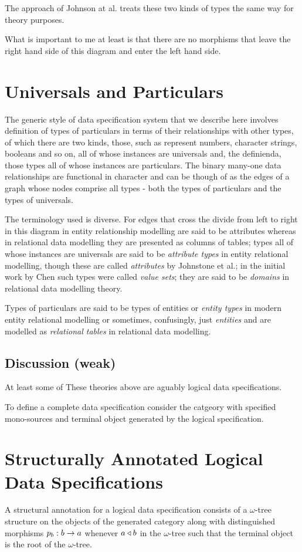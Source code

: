 \documentclass[10pt,a4paper]{article}
\theoremstyle{remark}
\begin{document}
The approach of Johnson at al. treats these two kinds of types the same way for theory purposes. 

What is important to me at least is that there are no morphisms that leave the right hand side of this diagram and enter the left hand side.


\section{Universals and Particulars}
The generic style of data specification system
that we describe here involves definition of types of particulars in terms of their relationships with other types,
of which there are two kinds, those, such as represent numbers, character strings, booleans and so on, all of
whose instances are universals and, the definienda, those types all of whose instances are particulars. The binary many-one data relationships  are functional in character and can be though of as the edges of a graph whose nodes comprise all types - both the types of particulars and the types of universals. 


The terminology used is diverse. For edges that cross the divide from left to right in this diagram 
in entity relationship modelling 
are said to be attributes whereas in relational data modelling they are presented as columns of tables; types all of whose instances are universals  are said to be \textit{attribute types} in entity relational 
modelling, though  these are called \textit{attributes} by Johnstone et al.; in the initial work by  Chen such types were called \textit{value sets}; they are said to be \textit{domains} in relational data modelling theory. 

\newcommand{\Veee}{V}
\newcommand{\veee}{v}
Types of particulars are said to be 
types of entities or \textit{entity types} in modern entity relational modelling
or sometimes, confusingly, just \textit{entities}  and 
are modelled as \textit{relational tables} in relational data modelling. 

\subsection*{Discussion (weak)}
At least some of These theories above are aguably logical data specifications.

To define a complete data specification consider the catgeory with specified mono-sources
and terminal object generated by the logical specification. 


\section{Structurally Annotated Logical Data Specifications}
A structural annotation for a logical data specification consists of a 
$\omega$-tree structure on the objects of the generated category \catcw
along with distinguished morphisms $p_b: b \rightarrow a$ whenever $a \triangleleft b$ in the  $\omega$-tree
such that the terminal object is the root of the $\omega$-tree.
\end{document}
